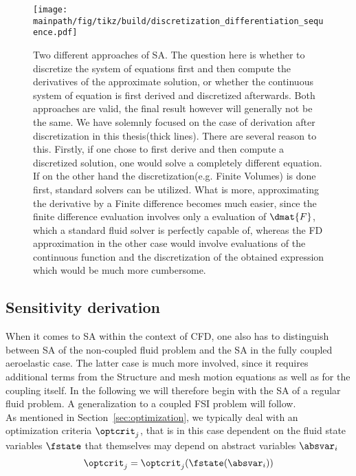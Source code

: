 \documentclass[../main.tex]{subfiles}
\begin{document}
 \begin{figure}[h!]
	\begin{center}
        \texttt{[image: \\mainpath/fig/tikz/build/discretization\_differentiation\_sequence.pdf]}
        \caption[Sensitivity Analysis approaches]{Two different approaches of \ac{SA}. The question here is whether to discretize the system of equations first and then compute the derivatives of the approximate solution, or whether the continuous system of equation is first derived and discretized afterwards. Both approaches are valid, the final result however will generally not be the same. We have solemnly focused on the case of derivation after discretization in this thesis(thick lines). There are several reason to this. Firstly, if one chose to first derive and then compute a discretized solution, one would solve a completely different equation. If on the other hand the discretization(e.g. Finite Volumes) is done first, standard solvers can be utilized. What is more, approximating the derivative by a Finite difference becomes much easier, since the finite difference evaluation involves only a evaluation of $\dmat{F}$, which a standard fluid solver is perfectly capable of, whereas the \ac{FD} approximation in the other case would involve evaluations of the continuous function and the discretization of the obtained expression which would be much more cumbersome.}
		\label{fig:discretization_differentiation_sequence}
    \end{center}
\end{figure}





\subsection{Sensitivity derivation}
When it comes to \ac{SA} within the context of \ac{CFD}, one also has to distinguish between \ac{SA} of the non-coupled fluid problem and the \ac{SA} in the fully coupled aeroelastic case. The latter case is much more involved, since it requires additional terms from the Structure and mesh motion equations as well as for the coupling itself. In the following we will therefore begin with the \ac{SA} of a regular fluid problem. A generalization to a coupled FSI problem will follow.
 \\


As mentioned in Section~\ref{sec:optimization}, we typically deal with an optimization criteria $\optcrit_j$, that is in this case dependent on the fluid state variables $\fstate$ that themselves may depend on abstract variables $\absvar_i$
\begin{align}
\optcrit_j=\optcrit_j(\fstate(\absvar_i))
\end{align}
\end{document}
